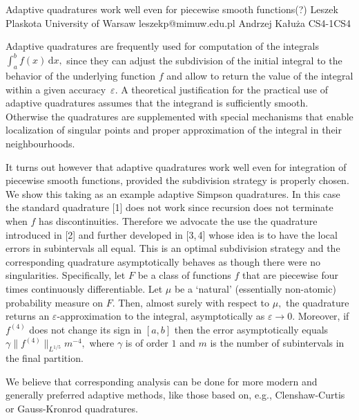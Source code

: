\begin{talk}
  {Adaptive quadratures work well even for piecewise smooth functions(?)}%
  {Leszek Plaskota}%
  {University of Warsaw}%
  {leszekp@mimuw.edu.pl}%
  {Andrzej Ka{\l}u{\.z}a}%
{}{}{CS4-1}{CS4}

				
Adaptive quadratures are frequently used for computation of the integrals $\int_a^bf(x)\,\mathrm dx,$ since they can adjust the subdivision of the initial integral to the behavior of the underlying function $f$ and allow to return the value of the integral within a given accuracy~$\varepsilon.$ A theoretical justification for the practical use of adaptive quadratures assumes that the integrand is sufficiently smooth. Otherwise the quadratures are supplemented with special mechanisms that enable localization of singular points and proper approximation of the integral in their neighbourhoods.

It turns out however that adaptive quadratures work well even for integration of piecewise smooth functions, provided the subdivision strategy is properly chosen. We show this taking as an example adaptive Simpson quadratures. In this case the standard quadrature [1] does not work since recursion does not terminate when $f$ has discontinuities. Therefore we advocate the use the quadrature introduced in [2] and further developed in [3,\,4] whose idea is to have the local errors in subintervals all equal. This is an optimal subdivision strategy and the corresponding quadrature asymptotically behaves as though there were no singularities. Specifically, let $F$ be a class of functions $f$ that are piecewise four times continuously differentiable. Let $\mu$ be a `natural' (essentially non-atomic) probability measure on $F.$ Then, almost surely with respect to $\mu,$ the quadrature returns an $\varepsilon$-approximation to the integral, asymptotically as $\varepsilon\to 0.$ Moreover, if $f^{(4)}$ does not change its sign in $[a,b]$ then the error asymptotically equals $\gamma\|f^{(4)}\|_{L^{1/5}}m^{-4},$ where $\gamma$ is of order $1$ and $m$ is the number of subintervals in the final partition.

We believe that corresponding analysis can be done for more modern and generally preferred adaptive methods, like those based on, e.g., Clenshaw-Curtis or Gauss-Kronrod quadratures.


\end{talk}
